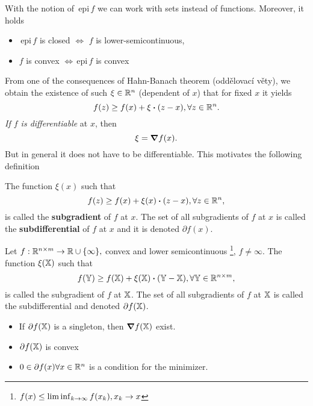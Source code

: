 \documentclass[reqno, a4paper]{article}
\begin{document}
\begin{remark}
    With the notion of $\, \text{epi} \,f$ we can work with sets instead of functions. Moreover, it holds
    \begin{itemize}
	    \item $\, \text{epi} \,f$ is closed $\Leftrightarrow$ $f$ is lower-semicontinuous,
	    \item $f$ is convex $\Leftrightarrow\, \text{epi} \,f$ is convex
    \end{itemize}
\end{remark}
From one of the consequences of Hahn-Banach theorem (oddělovací věty), we obtain the existence of such $\xi \in {\mathbb R}^n$ (dependent of $x$) that for fixed $x$ it yields
\[
	f(z) \geq f(x) + \xi \vdot (z-x), \forall z \in \R^n.
\]
\textit{If $f$ is differentiable} at $x$, then
\[
	\xi = \grad f(x).
\]
But in general it does not have to be differentiable. This motivates the following definition

\begin{definition}
	The function $\xi(x)$ such that
	\[
		f(z) \geq f(x) + \xi(x) \vdot (z-x), \forall z \in \R^n,
	\]
	is called the \textbf{subgradient} of $f$ at $x$.
	The set of all subgradients of $f$ at $x$ is called the \textbf{subdifferential} of $f$ at $x$ and it is denoted $\partial f (x).$

	Let $f: {\mathbb R}^{n \times m} \to {\mathbb R} \cup \{\infty\}, $ convex and lower semicontinuous \footnote{$f\qty(x) \leq \liminf_{k\to \infty}f(x_k), x_k \to x$}, $f \neq \infty$. The function $\xi\qty(\mathbb{X})$ such that
	\[
		f\qty(\tensorq{Y}) \geq f\qty(\tensorq{X})+ \xi\qty(\tensorq{X}) \vdot \qty(\tensorq{Y}- \tensorq{X}), \forall \tensorq{Y} \in \R^{n \times m},
	\]
	 is called the subgradient of $f$ at $\mathbb{X}$. The set of all subgradients of $f$ at $\mathbb{X}$ is called the subdifferential and denoted $\partial f\qty(\mathbb{X})$. 

\end{definition}


\begin{remark}
	\begin{itemize}
		\item If $\partial f\qty(\mathbb{X})$ is a singleton, then $\grad f\qty(\mathbb{X})$ exist.
		\item $\partial f\qty(\mathbb{X})$ is convex
		\item  $0 \in \partial f(x) \forall x \in {\mathbb R}^n$ is a condition for the minimizer.
	\end{itemize}
\end{remark}
\end{document}
